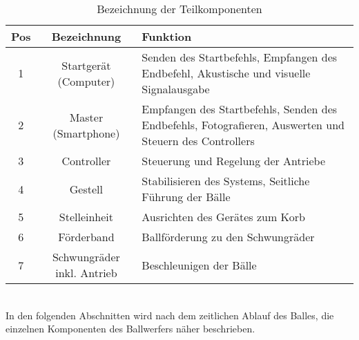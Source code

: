 \begin{table}[h!]
	\begin{tabular}{|c|c|p{7.5cm}|}
		\hline \textbf{Pos} & \textbf{Bezeichnung} & \textbf{Funktion} \\ 
		\hline 1 & Startgerät (Computer) & Senden des Startbefehls, Empfangen des Endbefehl, Akustische und visuelle Signalausgabe
		\\ 
		\hline 2 & Master  (Smartphone) & Empfangen des Startbefehls, Senden des Endbefehls,
		Fotografieren, Auswerten und Steuern des Controllers
		\\ 
		\hline 3 & Controller & Steuerung und Regelung der Antriebe \\ 
		\hline 4 & Gestell & Stabilisieren des Systems,
		Seitliche Führung der Bälle
		\\ 
		\hline 5 & Stelleinheit & Ausrichten des Gerätes zum Korb \\ 
		\hline 6 & Förderband & Ballförderung zu den Schwungräder \\ 
		\hline 7 & Schwungräder inkl. Antrieb & Beschleunigen der Bälle \\ 
		\hline 
	\end{tabular} 
	\centering
	\caption{Bezeichnung der Teilkomponenten}	
	\label{tab:BezTeilkomponenten}
\end{table}\\
In den folgenden Abschnitten wird nach dem zeitlichen Ablauf des Balles, die einzelnen Komponenten des Ballwerfers näher beschrieben. 